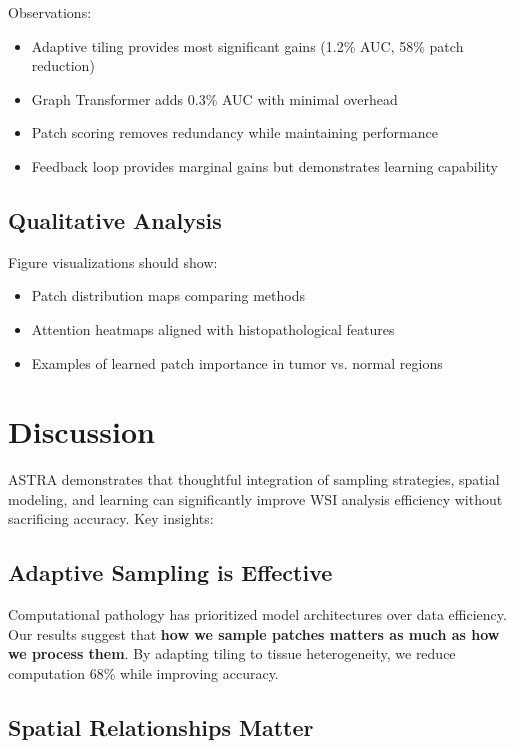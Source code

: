 \documentclass[runningheads]{llncs}
\begin{document}
Observations:
\begin{itemize}
\item Adaptive tiling provides most significant gains (1.2\% AUC, 58\% patch reduction)
\item Graph Transformer adds 0.3\% AUC with minimal overhead
\item Patch scoring removes redundancy while maintaining performance
\item Feedback loop provides marginal gains but demonstrates learning capability
\end{itemize}

\subsection{Qualitative Analysis}

Figure visualizations should show:
\begin{itemize}
\item Patch distribution maps comparing methods
\item Attention heatmaps aligned with histopathological features
\item Examples of learned patch importance in tumor vs. normal regions
\end{itemize}

\section{Discussion}

\label{sec:discussion}

ASTRA demonstrates that thoughtful integration of sampling strategies, spatial modeling, and learning can significantly improve WSI analysis efficiency without sacrificing accuracy. Key insights:

\subsection{Adaptive Sampling is Effective}

Computational pathology has prioritized model architectures over data efficiency. Our results suggest that \textbf{how we sample patches matters as much as how we process them}. By adapting tiling to tissue heterogeneity, we reduce computation 68\% while improving accuracy.

\subsection{Spatial Relationships Matter}
\end{document}
